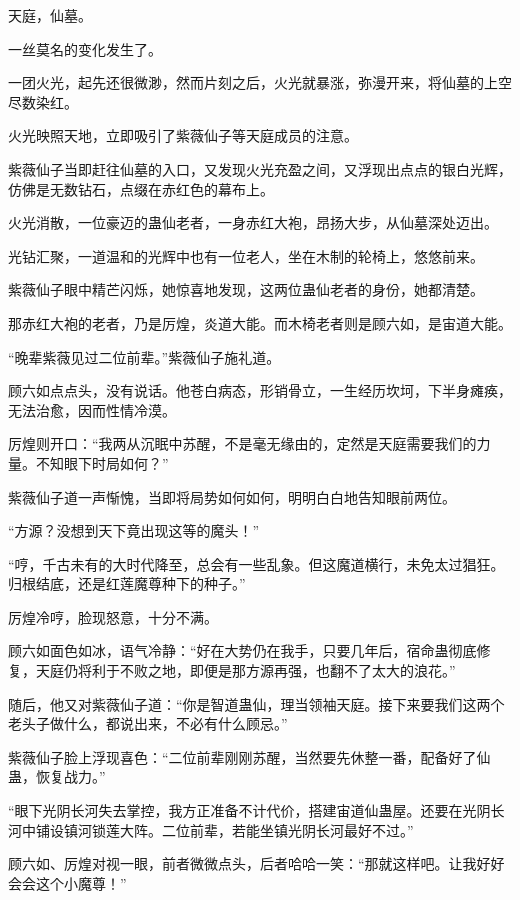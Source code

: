 
\begin{this_body}

天庭，仙墓。

一丝莫名的变化发生了。

一团火光，起先还很微渺，然而片刻之后，火光就暴涨，弥漫开来，将仙墓的上空尽数染红。

火光映照天地，立即吸引了紫薇仙子等天庭成员的注意。

紫薇仙子当即赶往仙墓的入口，又发现火光充盈之间，又浮现出点点的银白光辉，仿佛是无数钻石，点缀在赤红色的幕布上。

火光消散，一位豪迈的蛊仙老者，一身赤红大袍，昂扬大步，从仙墓深处迈出。

光钻汇聚，一道温和的光辉中也有一位老人，坐在木制的轮椅上，悠悠前来。

紫薇仙子眼中精芒闪烁，她惊喜地发现，这两位蛊仙老者的身份，她都清楚。

那赤红大袍的老者，乃是厉煌，炎道大能。而木椅老者则是顾六如，是宙道大能。

“晚辈紫薇见过二位前辈。”紫薇仙子施礼道。

顾六如点点头，没有说话。他苍白病态，形销骨立，一生经历坎坷，下半身瘫痪，无法治愈，因而性情冷漠。

厉煌则开口：“我两从沉眠中苏醒，不是毫无缘由的，定然是天庭需要我们的力量。不知眼下时局如何？”

紫薇仙子道一声惭愧，当即将局势如何如何，明明白白地告知眼前两位。

“方源？没想到天下竟出现这等的魔头！”

“哼，千古未有的大时代降至，总会有一些乱象。但这魔道横行，未免太过猖狂。归根结底，还是红莲魔尊种下的种子。”

厉煌冷哼，脸现怒意，十分不满。

顾六如面色如冰，语气冷静：“好在大势仍在我手，只要几年后，宿命蛊彻底修复，天庭仍将利于不败之地，即便是那方源再强，也翻不了太大的浪花。”

随后，他又对紫薇仙子道：“你是智道蛊仙，理当领袖天庭。接下来要我们这两个老头子做什么，都说出来，不必有什么顾忌。”

紫薇仙子脸上浮现喜色：“二位前辈刚刚苏醒，当然要先休整一番，配备好了仙蛊，恢复战力。”

“眼下光阴长河失去掌控，我方正准备不计代价，搭建宙道仙蛊屋。还要在光阴长河中铺设镇河锁莲大阵。二位前辈，若能坐镇光阴长河最好不过。”

顾六如、厉煌对视一眼，前者微微点头，后者哈哈一笑：“那就这样吧。让我好好会会这个小魔尊！”


\end{this_body}
